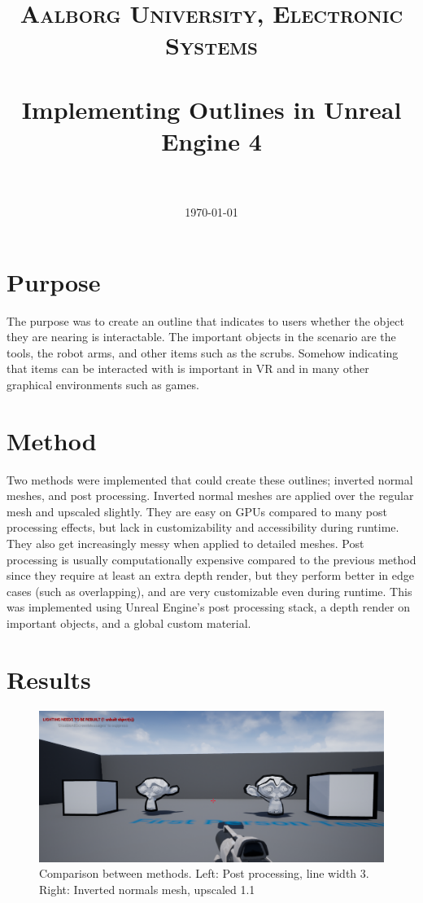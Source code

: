 \documentclass[paper=a4, fontsize=11pt]{scrartcl} %
\title{	
\normalfont \normalsize 
\textsc{Aalborg University, Electronic Systems} \\ [25pt] %
\horrule{0.5pt} \\[0.4cm] %
\huge Implementing Outlines in Unreal Engine 4 \\ %
\horrule{2pt} \\[0.5cm] %
}
\date{\normalsize\today} %
\numberwithin{equation}{section} %
\numberwithin{figure}{section} %
\numberwithin{table}{section} %
\begin{document}
\maketitle %


\section{Purpose}
The purpose was to create an outline that indicates to users whether the object they are nearing is interactable. The important objects in the scenario are the tools, the robot arms, and other items such as the scrubs. Somehow indicating that items can be interacted with is important in VR and in many other graphical environments such as games.

\section{Method}
Two methods were implemented that could create these outlines; inverted normal meshes, and post processing. Inverted normal meshes are applied over the regular mesh and upscaled slightly. They are easy on GPUs compared to many post processing effects, but lack in customizability and accessibility during runtime. They also get increasingly messy when applied to detailed meshes. Post processing is usually computationally expensive compared to the previous method since they require at least an extra depth render, but they perform better in edge cases (such as overlapping), and are very customizable even during runtime. This was implemented using Unreal Engine's post processing stack, a depth render on important objects, and a global custom material.

\section{Results}

\begin{figure}[H]
\centering
\includegraphics[width=1.0\textwidth]{comparison.png}
\caption{Comparison between methods. Left: Post processing, line width 3. Right: Inverted normals mesh, upscaled 1.1}
\label{fig:comparison}
\end{figure}
\end{document}
